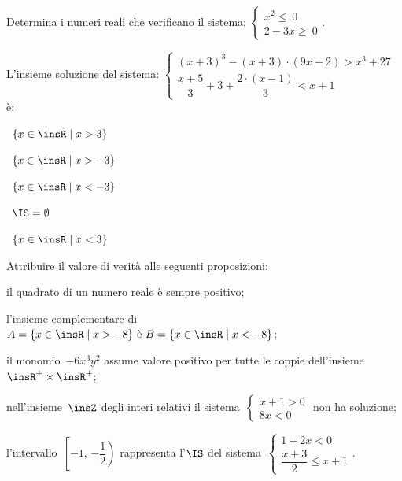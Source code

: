 \begin{esercizio}[\Ast]
 \label{ese:20.34}
 Determina i numeri reali che verificano il sistema:
 $\left\{%
  \begin{array}{l}
  x^{2}\le~0
  \\2-3x\ge~0
 \end{array}\right..$
 \end{esercizio}

\begin{esercizio}
 \label{ese:20.35}
 L'insieme soluzione del sistema:
$\left\{\begin{array}{l}
  (x+3)^{3}-(x+3)\cdot (9x-2)>x^{3}+27\\
  \dfrac{x+5}{3}+3+\dfrac{2\cdot (x-1)}{3}<x+1
 \end{array}\right.$ è:
\begin{multicols}{2}
\boxA\quad~$\left\{x\in \insR \mid x>3\right\}$

\boxB\quad~$\left\{x\in \insR \mid x>-3\right\}$

\boxC\quad~$\left\{x\in \insR \mid x<-3\right\}$

\boxD\quad~$\IS=\emptyset $

\boxE\quad~$\left\{x\in\insR \mid x<3\right\}$
\end{multicols}

\end{esercizio}

\begin{esercizio}
 \label{ese:20.36}
 Attribuire il valore di verità alle seguenti proposizioni:

\begin{enumeratea}
\item il quadrato di un numero reale è sempre positivo;
\item l'insieme complementare di~$A=\{x\in\insR\;|\;x>-8\}\text{ è }B=\{x\in\insR \mid x<-8\}$;
\item il monomio~$-6x^{3}y^{2}$ assume valore positivo per tutte le coppie dell'insieme~$\insR^{+}\times\insR^{+}$;
\item nell'insieme~$\insZ$ degli interi relativi il sistema~$\left\{\begin{array}{l}x+1>0\\8x<0\end{array}\right.$ non ha soluzione;
\item l'intervallo~$\left[-1\text{,~}\left.-{\dfrac{1}{2}}\right)\right.$ rappresenta l'$\IS$ del sistema~$\left\{\begin{array}{l}1+2x<0 \\\dfrac{x+3}{2}\le x+1\end{array}\right.$.
\end{enumeratea}
\end{esercizio}

